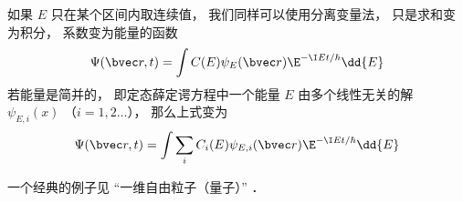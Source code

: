 如果 $E$ 只在某个区间内取连续值， 我们同样可以使用分离变量法， 只是求和变为积分， 系数变为能量的函数
\begin{equation}\label{TDSE_eq3}
\Psi(\bvec r, t) = \int C(E) \psi_E(\bvec r) \E^{-\I E t/\hbar} \dd{E}
\end{equation}
若能量是简并的， 即定态薛定谔方程中一个能量 $E$ 由多个线性无关的解 $\psi_{E,i}(x)$ （$i=1,2\dots$）， 那么上式变为
\begin{equation}\label{TDSE_eq4}
\Psi(\bvec r, t) = \int \sum_i C_i(E) \psi_{E,i}(\bvec r) \E^{-\I E t/\hbar} \dd{E}
\end{equation}

一个经典的例子见 “一维自由粒子（量子）” ．
